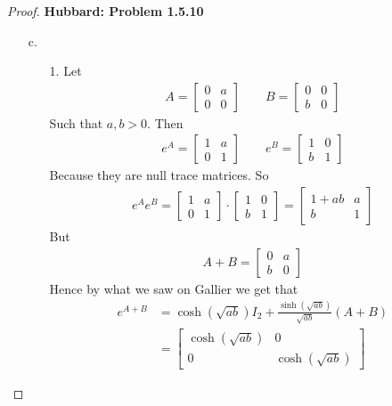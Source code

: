 \documentclass[11pt]{article}
\theoremstyle{definition}
\begin{document}
\begin{proof}{\textbf{Hubbard: Problem 1.5.10}}
\begin{itemize}
    \item[c.]
    \begin{itemize}
        \item [1.] Let
        \begin{align*}
            A = \begin{bmatrix} 0 & a\\ 0 & 0 \end{bmatrix}
            \quad\quad
            B = \begin{bmatrix} 0 & 0\\ b & 0 \end{bmatrix}            
        \end{align*}
        Such that $a, b > 0$. Then
        \begin{align*}
            e^A = \begin{bmatrix} 1 & a\\ 0 & 1 \end{bmatrix}
            \quad\quad
            e^B = \begin{bmatrix} 1 & 0\\ b & 1 \end{bmatrix}
        \end{align*}
        Because they are null trace matrices. So
        \begin{align*}
            e^Ae^B = \begin{bmatrix} 1 & a\\ 0 & 1 \end{bmatrix}
            \cdot \begin{bmatrix} 1 & 0\\ b & 1 \end{bmatrix}
            = \begin{bmatrix} 1 + ab & a\\ b & 1 \end{bmatrix}
        \end{align*}
        But 
        \begin{align*}
            A+B = \begin{bmatrix} 0 & a\\ b & 0 \end{bmatrix}
        \end{align*}
        Hence by what we saw on Gallier we get that
        \begin{align*}
            e^{A+B} &= \cosh(\sqrt{ab}) I_2 + \frac{\sinh(\sqrt{ab})}{\sqrt{ab}}(A + B)\\
            &= \begin{bmatrix} \cosh(\sqrt{ab}) & 0\\ 0 & \cosh(\sqrt{ab}) \end{bmatrix}

\end{align*}
\end{itemize}
\end{itemize}
\end{proof}
\end{document}

